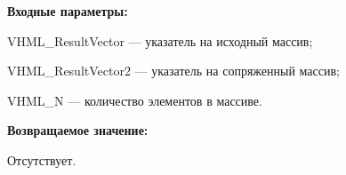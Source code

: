 \textbf{Входные параметры:}
 
VHML\_ResultVector --- указатель на исходный массив;
 
VHML\_ResultVector2 --- указатель на сопряженный массив;
 
VHML\_N --- количество элементов в массиве.

\textbf{Возвращаемое значение:}

Отсутствует.